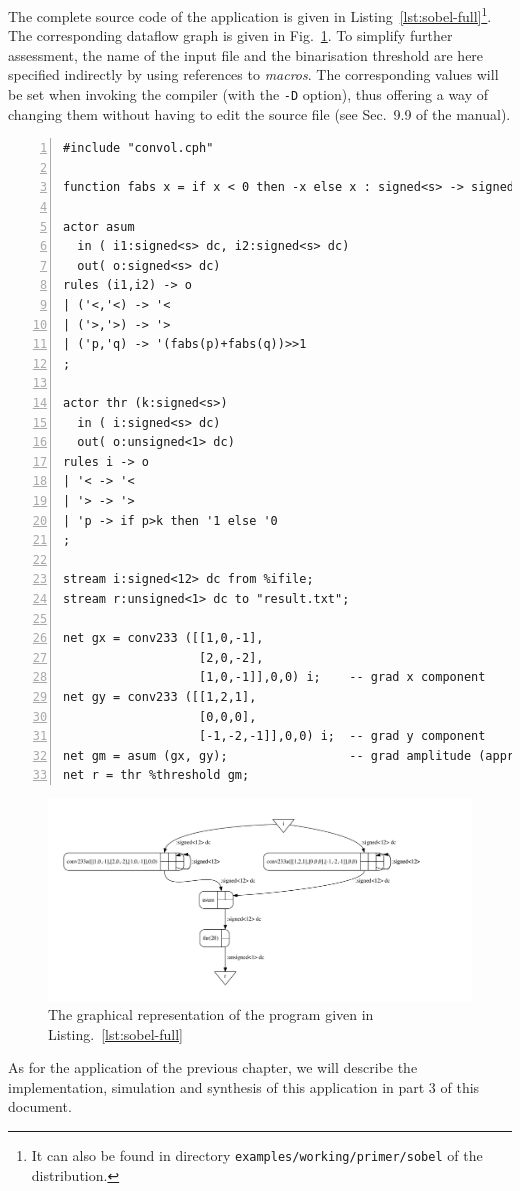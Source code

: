 \medskip
The complete source code of the application is given in
Listing~\ref{lst:sobel-full}\footnote{It can also be found in directory
  \texttt{examples/working/primer/sobel} of the distribution.}. The corresponding dataflow graph is
given in Fig.~\ref{fig:sobel-full}. To simplify further assessment, the name of the input file and
the binarisation threshold are here specified indirectly by using references to \emph{macros}.
The corresponding values will be set
when invoking the compiler (with the \verb|-D| option), thus
offering a way of changing them without having to edit the source file (see Sec.~9.9 of the manual).

\begin{lstlisting}[style=CaphStyle,numbers=left,caption={Complete source code of the Sobel-based
    edge extraction},label={lst:sobel-full}]
#include "convol.cph"

function fabs x = if x < 0 then -x else x : signed<s> -> signed<s>;

actor asum
  in ( i1:signed<s> dc, i2:signed<s> dc)
  out( o:signed<s> dc)
rules (i1,i2) -> o
| ('<,'<) -> '<
| ('>,'>) -> '>
| ('p,'q) -> '(fabs(p)+fabs(q))>>1
;

actor thr (k:signed<s>)
  in ( i:signed<s> dc)
  out( o:unsigned<1> dc)
rules i -> o
| '< -> '<
| '> -> '>
| 'p -> if p>k then '1 else '0
;

stream i:signed<12> dc from %ifile;
stream r:unsigned<1> dc to "result.txt";

net gx = conv233 ([[1,0,-1],
                   [2,0,-2],
                   [1,0,-1]],0,0) i;    -- grad x component
net gy = conv233 ([[1,2,1],
                   [0,0,0],
                   [-1,-2,-1]],0,0) i;  -- grad y component
net gm = asum (gx, gy);                 -- grad amplitude (approx)
net r = thr %threshold gm;
\end{lstlisting}

\begin{figure}[htbp]
  \centering
 \includegraphics[width=\textwidth]{./figs/sobel-full.pdf}
  \caption{The graphical representation of the program given in Listing.~\ref{lst:sobel-full}}
  \label{fig:sobel-full}
\end{figure}

\bigskip
As for the application of the previous chapter, we will describe the implementation, simulation and
synthesis of this application in part 3 of this document.


